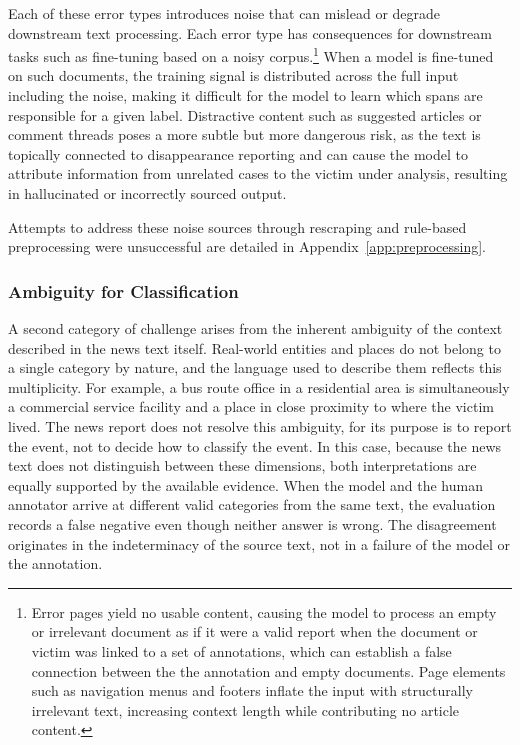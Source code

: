 \documentclass{article}
\begin{document}
Each of these error types introduces noise that can mislead or
degrade downstream text processing. Each error type has consequences for downstream tasks such as fine-tuning based on a noisy corpus.\footnote{Error pages yield no usable content, causing the model to process an empty or irrelevant document as if it were a valid report when the document or victim was linked to a set of annotations, which can establish a false connection
between the the annotation and empty documents. Page elements such as
navigation menus and footers inflate the input with structurally
irrelevant text, increasing context length while contributing no article
content.} When a model is fine-tuned on such documents, the training
signal is distributed across the full input including the noise, making
it difficult for the model to learn which spans are responsible for a
given label. Distractive content such as suggested articles or comment
threads poses a more subtle but more dangerous risk, as the text is
topically connected to disappearance reporting and can cause the model
to attribute information from unrelated cases to the victim under
analysis, resulting in hallucinated or incorrectly sourced output.

Attempts to address these noise sources through rescraping and rule-based preprocessing were unsuccessful are detailed in Appendix~\ref{app:preprocessing}.

\subsubsection{Ambiguity for
Classification}\label{ambiguity-for-classification}

A second category of challenge arises from the inherent ambiguity of the
context described in the news text itself. Real-world entities and
places do not belong to a single category by nature, and the language
used to describe them reflects this multiplicity. For example, a bus
route office in a residential area is simultaneously a commercial
service facility and a place in close proximity to where the victim
lived. The news report does not resolve this ambiguity, for its purpose
is to report the event, not to decide how to classify the event. In this
case, because the news text does not distinguish between these
dimensions, both interpretations are equally supported by the available
evidence. When the model and the human annotator arrive at different
valid categories from the same text, the evaluation records a false
negative even though neither answer is wrong. The disagreement
originates in the indeterminacy of the source text, not in a failure of
the model or the annotation.
\end{document}
